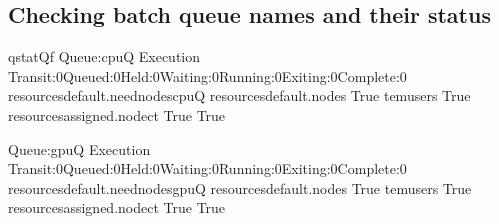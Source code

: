 \documentclass[a4paper,10pt,english]{sphinxmanual}
\begin{document}
\subsection{Checking batch queue names and their status}
\label{\detokenize{newfarm:checking-batch-queue-names-and-their-status}}
\begin{sphinxVerbatim}[commandchars=\\\{\}]
\PYGZdl{}\PYGZgt{}qstat\PYGZhy{}Qf
Queue:cpuQ
Execution
Transit:0Queued:0Held:0Waiting:0Running:0Exiting:0Complete:0
resources\PYGZus{}default.neednodescpuQ
resources\PYGZus{}default.nodes
True
tem\PYGZus{}users
True
resources\PYGZus{}assigned.nodect
True
True

Queue:gpuQ
Execution
Transit:0Queued:0Held:0Waiting:0Running:0Exiting:0Complete:0
resources\PYGZus{}default.neednodesgpuQ
resources\PYGZus{}default.nodes
True
tem\PYGZus{}users
True
resources\PYGZus{}assigned.nodect
True
True
\end{sphinxVerbatim}
\end{document}
